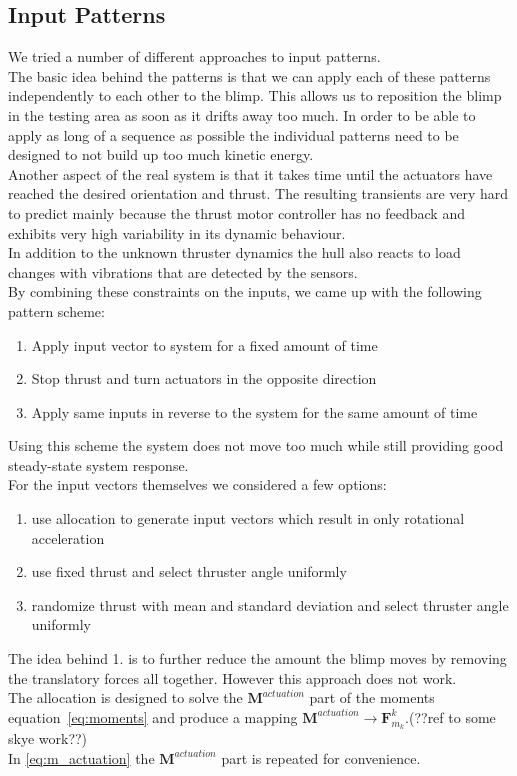 \subsection{Input Patterns}
\label{sub:input_pattern}
We tried a number of different approaches to input patterns. \\
The basic idea behind the patterns is that we can apply each of these patterns independently to each other to the blimp.
This allows us to reposition the blimp in the testing area as soon as it drifts away too much.
In order to be able to apply as long of a sequence as possible the individual patterns need to be designed to not build up too much kinetic energy.\\
Another aspect of the real system is that it takes time until the actuators have reached the desired orientation and thrust.
The resulting transients are very hard to predict mainly because the thrust motor controller has no feedback and exhibits very high variability in its dynamic behaviour. \\
In addition to the unknown thruster dynamics the hull also reacts to load changes with vibrations that are detected by the sensors. \\
By combining these constraints on the inputs, we came up with the following pattern scheme:
\begin{enumerate}
\item Apply input vector to system for a fixed amount of time
\item Stop thrust and turn actuators in the opposite direction
\item Apply same inputs in reverse to the system for the same amount of time
\end{enumerate}
Using this scheme the system does not move too much while still providing good steady-state system response. \\
For the input vectors themselves we considered a few options:\\
\begin{enumerate}
\item use allocation to generate input vectors which result in only rotational acceleration
\item use fixed thrust and select thruster angle uniformly
\item randomize thrust with mean and standard deviation and select thruster angle uniformly
\end{enumerate}
The idea behind 1. is to further reduce the amount the blimp moves by removing the translatory forces all together. 
However this approach does not work.\\
The allocation is designed to solve the $\mathbf{M}^{actuation}$ part of the moments equation~\ref{eq:moments} and produce a mapping $\mathbf{M}^{actuation} \rightarrow \mathbf{F}^k_{m_k}$.(??ref to some skye work??)\\
In \ref{eq:m_actuation} the $\mathbf{M}^{actuation}$ part is repeated for convenience.

